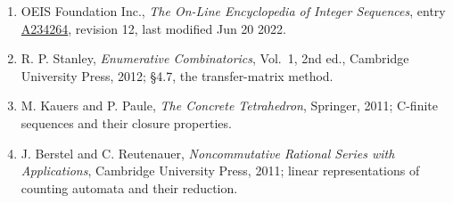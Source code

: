 \documentclass[11pt]{article}
\theoremstyle{definition}
\begin{document}
\begin{enumerate}

\item OEIS Foundation Inc., \emph{The On-Line Encyclopedia of Integer Sequences}, entry \href{https://oeis.org/A234264}{A234264}, revision 12, last modified Jun 20 2022.

\item R. P. Stanley, \emph{Enumerative Combinatorics}, Vol.~1, 2nd ed., Cambridge University Press, 2012; \S4.7, the transfer-matrix method.

\item M. Kauers and P. Paule, \emph{The Concrete Tetrahedron}, Springer, 2011; C-finite sequences and their closure properties.

\item J. Berstel and C. Reutenauer, \emph{Noncommutative Rational Series with Applications}, Cambridge University Press, 2011; linear representations of counting automata and their reduction.

\end{enumerate}
\end{document}
